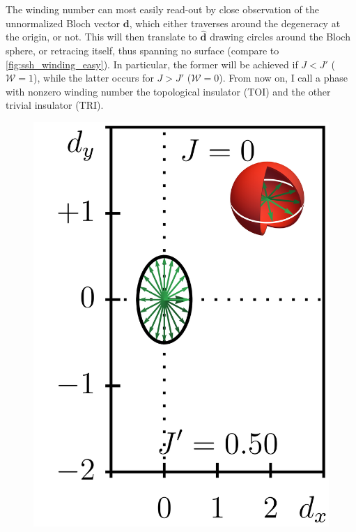 The winding number can most easily read-out by close observation of the unnormalized Bloch vector ${\bm d}$, which either traverses around the degeneracy at the origin, or not.
This will then translate to $\hat{\bm d}$ drawing circles around the Bloch sphere, or retracing itself, thus spanning no surface (compare to \cref{fig:ssh_winding_easy}).
In particular, the former will be achieved if $J<J'$ ($\mathcal W=1$), while the latter occurs for $J>J'$ ($\mathcal W=0$).
From now on, I call a phase with nonzero winding number the topological insulator (TOI) and the other trivial insulator (TRI).
\begin{figure}[ht]
    \centering
    \includegraphics{figures/ssh_unnormalized_winding_2.png}

\end{figure}
